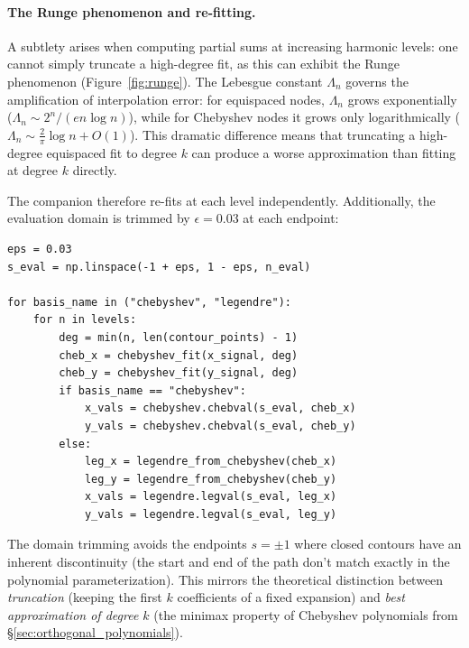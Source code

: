 \documentclass[12pt,a4paper]{report}
\theoremstyle{thms}
\theoremstyle{defns}
\begin{document}
\paragraph{The Runge phenomenon and re-fitting.} A subtlety arises when computing partial sums at increasing harmonic levels: one cannot simply truncate a high-degree fit, as this can exhibit the Runge phenomenon (Figure~\ref{fig:runge}). The Lebesgue constant $\Lambda_n$ governs the amplification of interpolation error: for equispaced nodes, $\Lambda_n$ grows exponentially ($\Lambda_n \sim 2^n / (en \log n)$), while for Chebyshev nodes it grows only logarithmically ($\Lambda_n \sim \frac{2}{\pi}\log n + O(1)$). This dramatic difference means that truncating a high-degree equispaced fit to degree $k$ can produce a worse approximation than fitting at degree $k$ directly.

The companion therefore re-fits at each level independently. Additionally, the evaluation domain is trimmed by $\epsilon = 0.03$ at each endpoint:

\begin{lstlisting}[caption={Runge-avoiding re-fit loop (\texttt{bases\_evaluation.py})}]
eps = 0.03
s_eval = np.linspace(-1 + eps, 1 - eps, n_eval)

for basis_name in ("chebyshev", "legendre"):
    for n in levels:
        deg = min(n, len(contour_points) - 1)
        cheb_x = chebyshev_fit(x_signal, deg)
        cheb_y = chebyshev_fit(y_signal, deg)
        if basis_name == "chebyshev":
            x_vals = chebyshev.chebval(s_eval, cheb_x)
            y_vals = chebyshev.chebval(s_eval, cheb_y)
        else:
            leg_x = legendre_from_chebyshev(cheb_x)
            leg_y = legendre_from_chebyshev(cheb_y)
            x_vals = legendre.legval(s_eval, leg_x)
            y_vals = legendre.legval(s_eval, leg_y)
\end{lstlisting}

The domain trimming avoids the endpoints $s = \pm 1$ where closed contours have an inherent discontinuity (the start and end of the path don't match exactly in the polynomial parameterization). This mirrors the theoretical distinction between \textit{truncation} (keeping the first $k$ coefficients of a fixed expansion) and \textit{best approximation of degree $k$} (the minimax property of Chebyshev polynomials from \S\ref{sec:orthogonal_polynomials}).
\end{document}

